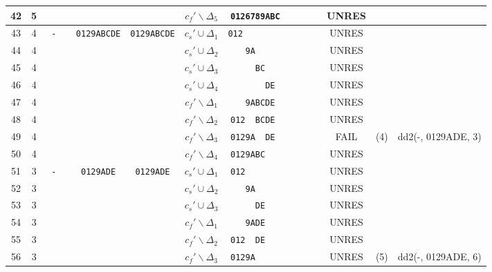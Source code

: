 \documentclass[10pt, a4paper]{article}
\begin{document}
\begin{landscape}
\begin{tabular}{|c|c|c|c|c|c|c|c|c|c|}
  42  & 5 & \verb+    +&  & & $c_f' \backslash \Delta_5 $ & \verb+0126789ABC       + & UNRES &  &  \\ \hline
  43  & 4 & \verb+ -  +& \verb+0129ABCDE+  & \verb+0129ABCDE+ & $c_s' \cup \Delta_1 $ & \verb+012               + & UNRES &  &  \\
  44  & 4 & \verb+    +&  & & $c_s' \cup \Delta_2 $ & \verb+   9A            + & UNRES &  &  \\
  45  & 4 & \verb+    +&  & & $c_s' \cup \Delta_3 $ & \verb+     BC          + & UNRES &  &  \\
  46  & 4 & \verb+    +&  & & $c_s' \cup \Delta_4 $ & \verb+       DE        + & UNRES &  &  \\
  47  & 4 & \verb+    +&  & & $c_f' \backslash \Delta_1 $ & \verb+   9ABCDE        + & UNRES &  &  \\
  48  & 4 & \verb+    +&  & & $c_f' \backslash \Delta_2 $ & \verb+012  BCDE        + & UNRES &  &  \\
  49  & 4 & \verb+    +&  & & $c_f' \backslash \Delta_3 $ & \verb+0129A  DE        + & FAIL & (4)& dd2(-, 0129ADE, 3)  \\
  50  & 4 & \verb+    +&  & & $c_f' \backslash \Delta_4 $ & \verb+0129ABC          + & UNRES &  &  \\ \hline
  51  & 3 & \verb+ -  +& \verb+0129ADE+  & \verb+0129ADE+ & $c_s' \cup \Delta_1 $ & \verb+012              + & UNRES &  &  \\
  52  & 3 & \verb+    +&  & & $c_s' \cup \Delta_2 $ & \verb+   9A            + & UNRES &  &  \\
  53  & 3 & \verb+    +&  & & $c_s' \cup \Delta_3 $ & \verb+     DE          + & UNRES &  &  \\
  54  & 3 & \verb+    +&  & & $c_f' \backslash \Delta_1 $ & \verb+   9ADE          + & UNRES &  &  \\
  55  & 3 & \verb+    +&  & & $c_f' \backslash \Delta_2 $ & \verb+012  DE          + & UNRES &  &  \\
  56  & 3 & \verb+    +&  & & $c_f' \backslash \Delta_3 $ & \verb+0129A            + & UNRES & (5)& dd2(-, 0129ADE, 6)  \\ \hline
  \end{tabular}
\end{landscape}
\end{document}
